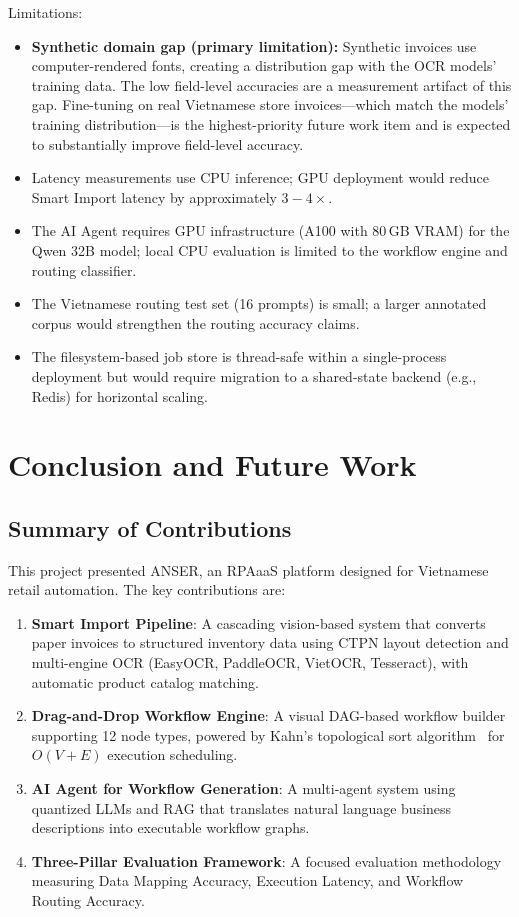 \documentclass[11pt,a4paper]{report}
\begin{document}
Limitations:
\begin{itemize}
  \item \textbf{Synthetic domain gap (primary limitation):} Synthetic invoices use computer-rendered fonts, creating a distribution gap with the OCR models' training data. The low field-level accuracies are a measurement artifact of this gap. Fine-tuning on real Vietnamese store invoices---which match the models' training distribution---is the highest-priority future work item and is expected to substantially improve field-level accuracy.
  \item Latency measurements use CPU inference; GPU deployment would reduce Smart Import latency by approximately $3{-}4\times$.
  \item The AI Agent requires GPU infrastructure (A100 with 80\,GB VRAM) for the Qwen 32B model; local CPU evaluation is limited to the workflow engine and routing classifier.
  \item The Vietnamese routing test set (16 prompts) is small; a larger annotated corpus would strengthen the routing accuracy claims.
  \item The filesystem-based job store is thread-safe within a single-process deployment but would require migration to a shared-state backend (e.g., Redis) for horizontal scaling.
\end{itemize}

\chapter{Conclusion and Future Work}
\label{ch:conclusion}

\section{Summary of Contributions}

This project presented ANSER, an RPAaaS platform designed for Vietnamese retail automation. The key contributions are:

\begin{enumerate}
  \item \textbf{Smart Import Pipeline}: A cascading vision-based system that converts paper invoices to structured inventory data using CTPN layout detection and multi-engine OCR (EasyOCR, PaddleOCR, VietOCR, Tesseract), with automatic product catalog matching.
  \item \textbf{Drag-and-Drop Workflow Engine}: A visual DAG-based workflow builder supporting 12 node types, powered by Kahn's topological sort algorithm~\cite{kahn1962} for $O(V+E)$ execution scheduling.
  \item \textbf{AI Agent for Workflow Generation}: A multi-agent system using quantized LLMs and RAG that translates natural language business descriptions into executable workflow graphs.
  \item \textbf{Three-Pillar Evaluation Framework}: A focused evaluation methodology measuring Data Mapping Accuracy, Execution Latency, and Workflow Routing Accuracy.
\end{enumerate}
\end{document}
